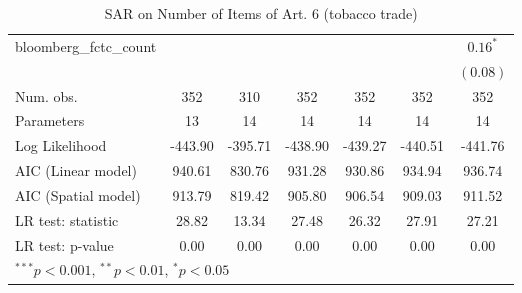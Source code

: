 \begin{table}[!h]
\begin{center}
\begin{tabular}{l c c c c c c }
bloomberg\_fctc\_count  &              &              &              &              &              & $0.16^{*}$   \\
                        &              &              &              &              &              & $(0.08)$     \\
\midrule
Num. obs.               & 352          & 310          & 352          & 352          & 352          & 352          \\
Parameters              & 13           & 14           & 14           & 14           & 14           & 14           \\
Log Likelihood          & -443.90      & -395.71      & -438.90      & -439.27      & -440.51      & -441.76      \\
AIC (Linear model)      & 940.61       & 830.76       & 931.28       & 930.86       & 934.94       & 936.74       \\
AIC (Spatial model)     & 913.79       & 819.42       & 905.80       & 906.54       & 909.03       & 911.52       \\
LR test: statistic      & 28.82        & 13.34        & 27.48        & 26.32        & 27.91        & 27.21        \\
LR test: p-value        & 0.00         & 0.00         & 0.00         & 0.00         & 0.00         & 0.00         \\
\bottomrule
\multicolumn{7}{l}{\scriptsize{$^{***}p<0.001$, $^{**}p<0.01$, $^*p<0.05$}}
\end{tabular}
\caption{SAR on Number of Items of Art. 6 (tobacco trade)}
\label{table:coefficients}
\end{center}
\end{table}
